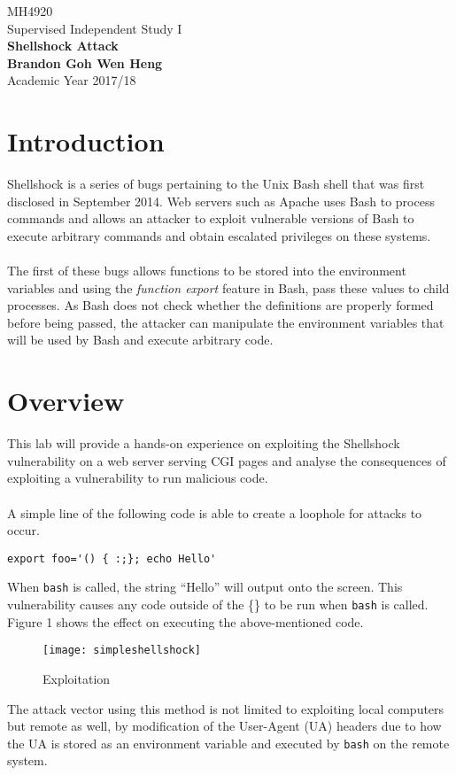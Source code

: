 \documentclass[a4paper,12pt]{article}
\begin{document}
	\begin{titlepage}
		\begin{center}
			\vspace*{9em}
			\Huge 
			MH4920\\ Supervised Independent Study I\\
			\vspace*{4em}
			\LARGE
			\textbf{Shellshock Attack}\\		
			\vspace{4em}
			\textbf{Brandon Goh Wen Heng}\\
			\vspace*{4em}
			Academic Year 2017/18
			\vfill
		\end{center}
	\end{titlepage}
	
	\tableofcontents
	\newpage
	\section{Introduction}
Shellshock is a series of bugs pertaining to the Unix Bash shell that was first disclosed in September 2014. Web servers such as Apache uses Bash to process commands and allows an attacker to exploit vulnerable versions of Bash to execute arbitrary commands and obtain escalated privileges on these systems.\\\\The first of these bugs allows functions to be stored into the environment variables and using the \textit{function export} feature in Bash, pass these values to child processes. As Bash does not check whether the definitions are properly formed before being passed, the attacker can manipulate the environment variables that will be used by Bash and execute arbitrary code.
\section{Overview}
This lab will provide a hands-on experience on exploiting the Shellshock vulnerability on a web server serving CGI pages and analyse the consequences of exploiting a vulnerability to run malicious code.\\\\A simple line of the following code is able to create a loophole for attacks to occur.\begin{verbatim}
export foo='() { :;}; echo Hello'
\end{verbatim}
When \texttt{bash} is called, the string ``Hello'' will output onto the screen. This vulnerability causes any code outside of the \{\} to be run when \texttt{bash} is called. Figure 1 shows the effect on executing the above-mentioned code.
\begin{figure}[H]
	\centering
	\texttt{[image: simpleshellshock]}
	\caption{Exploitation}
	\label{fig:simpleshellshock}
\end{figure}
\noindent The attack vector using this method is not limited to exploiting local computers but remote as well, by modification of the User-Agent (UA) headers due to how the UA is stored as an environment variable and executed by \texttt{bash} on the remote system.
\newpage
\end{document}

